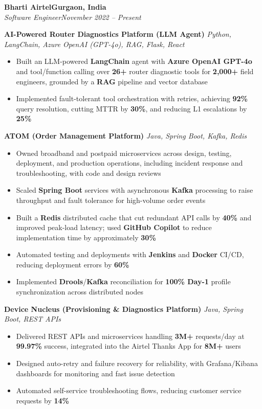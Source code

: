 \documentclass[letterpaper,11pt]{article}
\newcommand{\resumeItem}[1]{
  \item\small{{#1 \vspace{-2pt}}}
}
\newcommand{\resumeSubheading}[4]{
  \vspace{-2pt}\item
    \textbf{#1}\hfill \textbf{\small #2} \\
    \textit{\small #3}\hfill \textit{\small #4}\vspace{-7pt}
}
\newcommand{\resumeItemListStart}{\begin{itemize}}
\newcommand{\resumeItemListEnd}{\end{itemize}\vspace{-5pt}}
\begin{document}
    \resumeSubheading
      {Bharti Airtel}{Gurgaon, India}
      {Software Engineer}{November 2022 -- Present}

      \vspace{4pt}
      \textbf{\small AI-Powered Router Diagnostics Platform (LLM Agent)} \hfill \textit{\small Python, LangChain, Azure OpenAI (GPT-4o), RAG, Flask, React} \\
      \vspace{-2pt}
      \resumeItemListStart
        \resumeItem{Built an LLM-powered \textbf{LangChain} agent with \textbf{Azure OpenAI GPT-4o} and tool/function calling over \textbf{26+} router diagnostic tools for \textbf{2,000+} field engineers, grounded by a \textbf{RAG} pipeline and vector database}
        \resumeItem{Implemented fault-tolerant tool orchestration with retries, achieving \textbf{92\%} query resolution, cutting MTTR by \textbf{30\%}, and reducing L1 escalations by \textbf{25\%}}
      \resumeItemListEnd

      \vspace{4pt}
      \textbf{\small ATOM (Order Management Platform)} \hfill \textit{\small Java, Spring Boot, Kafka, Redis} \\
      \vspace{-2pt}
      \resumeItemListStart
        \resumeItem{Owned broadband and postpaid microservices across design, testing, deployment, and production operations, including incident response and troubleshooting, with code and design reviews}
        \resumeItem{Scaled \textbf{Spring Boot} services with asynchronous \textbf{Kafka} processing to raise throughput and fault tolerance for high-volume order events}
        \resumeItem{Built a \textbf{Redis} distributed cache that cut redundant API calls by \textbf{40\%} and improved peak-load latency; used \textbf{GitHub Copilot} to reduce implementation time by approximately \textbf{30\%}}
        \resumeItem{Automated testing and deployments with \textbf{Jenkins} and \textbf{Docker} CI/CD, reducing deployment errors by \textbf{60\%}}
        \resumeItem{Implemented \textbf{Drools}/\textbf{Kafka} reconciliation for \textbf{100\% Day-1} profile synchronization across distributed nodes}
      \resumeItemListEnd

      \vspace{4pt}
      \textbf{\small Device Nucleus (Provisioning \& Diagnostics Platform)} \hfill \textit{\small Java, Spring Boot, REST APIs} \\
      \vspace{-2pt}
      \resumeItemListStart
        \resumeItem{Delivered REST APIs and microservices handling \textbf{3M+} requests/day at \textbf{99.97\%} success, integrated into the Airtel Thanks App for \textbf{8M+} users}
        \resumeItem{Designed auto-retry and failure recovery for reliability, with Grafana/Kibana dashboards for monitoring and fast issue detection}
        \resumeItem{Automated self-service troubleshooting flows, reducing customer service requests by \textbf{14\%}}
      \resumeItemListEnd
\end{document}
